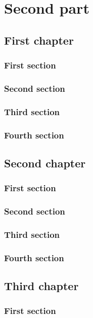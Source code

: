 \documentclass{researchbook}
\theoremstyle{plain}
\theoremstyle{definition}
\theoremstyle{remark}
\begin{document}
\part{Second part}
\chapter{First chapter}

\section{First section}\lipsum
\section{Second section}\lipsum
\section{Third section}\lipsum
\section{Fourth section}\lipsum


\chapter{Second chapter}

\section{First section}\lipsum
\section{Second section}\lipsum
\section{Third section}\lipsum
\section{Fourth section}\lipsum


\chapter{Third chapter}

\section{First section}\lipsum
\end{document}
